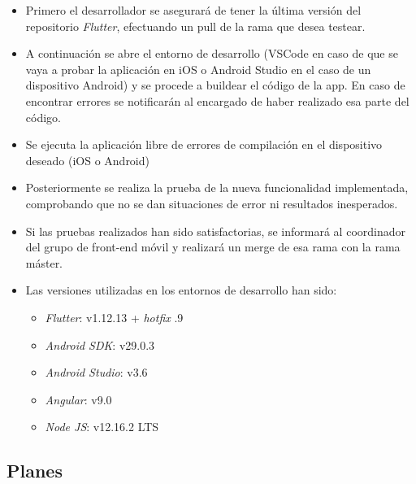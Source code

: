 \documentclass{article}
\begin{document}
	\begin{itemize}
		\item Primero el desarrollador se asegurará de tener la última versión del repositorio \textit{Flutter}, efectuando un pull de la rama que desea testear.
		
		\item A continuación se abre el entorno de desarrollo (VSCode en caso de que se vaya a probar la aplicación en iOS o Android Studio en el caso de un dispositivo Android) y se procede a buildear el código de la app. En caso de encontrar errores se notificarán al encargado de haber realizado esa parte del código.
		
		\item Se ejecuta la aplicación libre de errores de compilación en el dispositivo deseado (iOS o Android)
		
		\item Posteriormente se realiza la prueba de la nueva funcionalidad implementada, comprobando que no se dan situaciones de error ni resultados inesperados.
		
		\item Si las pruebas realizados han sido satisfactorias, se informará al coordinador del grupo de front-end móvil y realizará un merge de esa rama con la rama máster.
		
		\item Las versiones utilizadas en los entornos de desarrollo han sido:
		\begin{itemize}
			\item \textit{Flutter}: v1.12.13 + \textit{hotfix} .9
			\item \textit{Android SDK}: v29.0.3
			\item \textit{Android Studio}: v3.6
			\item \textit{Angular}: v9.0
			\item \textit{Node JS}: v12.16.2 LTS
		\end{itemize}
	\end{itemize}
\newpage
\subsection{Planes}
\end{document}
